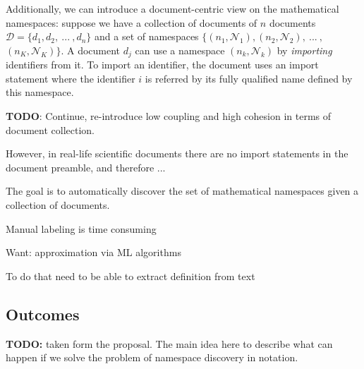 Additionally, we can introduce a document-centric view on the mathematical 
namespaces: suppose we have a collection of documents of $n$ documents 
$\mathcal D = \{ d_1, d_2, \ ... \ , d_n \}$ and a set of namespaces 
$\{(n_1, \mathcal N_1), (n_2, \mathcal N_2), \ ... \ ,$ $(n_K, \mathcal N_K) \}$. 
A document $d_j$ can use a namespace $(n_k, \mathcal N_k)$ by \emph{importing} 
identifiers from it. To import an identifier, the document uses an import statement 
where the identifier $i$ is referred by its fully qualified name
defined by this namespace. 

\textbf{TODO}: Continue, re-introduce low coupling and high cohesion in terms of 
document collection. 


However, in real-life scientific documents there are no import statements in the document
preamble, and therefore ...

The goal is to automatically discover the set of mathematical namespaces 
given a collection of documents. 

Manual labeling is time consuming 

Want: approximation via ML algorithms

To do that need to be able to extract definition from text






\subsection{Outcomes}


\textbf{TODO:} taken form the proposal.
The main idea here to describe what can happen if we solve the problem of 
namespace discovery in notation.

\ \\

